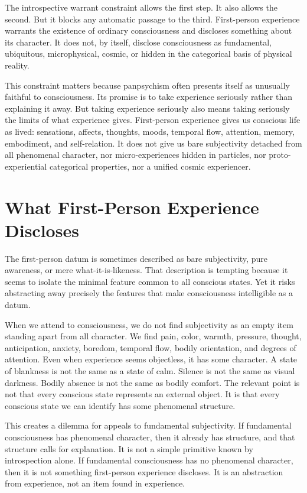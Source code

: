 \documentclass[12pt]{article}
\begin{document}
The introspective warrant constraint allows the first step. It also allows the second. But it blocks any automatic passage to the third. First-person experience warrants the existence of ordinary consciousness and discloses something about its character. It does not, by itself, disclose consciousness as fundamental, ubiquitous, microphysical, cosmic, or hidden in the categorical basis of physical reality.

This constraint matters because panpsychism often presents itself as unusually faithful to consciousness. Its promise is to take experience seriously rather than explaining it away. But taking experience seriously also means taking seriously the limits of what experience gives. First-person experience gives us conscious life as lived: sensations, affects, thoughts, moods, temporal flow, attention, memory, embodiment, and self-relation. It does not give us bare subjectivity detached from all phenomenal character, nor micro-experiences hidden in particles, nor proto-experiential categorical properties, nor a unified cosmic experiencer.

\section{What First-Person Experience Discloses}

The first-person datum is sometimes described as bare subjectivity, pure awareness, or mere what-it-is-likeness. That description is tempting because it seems to isolate the minimal feature common to all conscious states. Yet it risks abstracting away precisely the features that make consciousness intelligible as a datum.

When we attend to consciousness, we do not find subjectivity as an empty item standing apart from all character. We find pain, color, warmth, pressure, thought, anticipation, anxiety, boredom, temporal flow, bodily orientation, and degrees of attention. Even when experience seems objectless, it has some character. A state of blankness is not the same as a state of calm. Silence is not the same as visual darkness. Bodily absence is not the same as bodily comfort. The relevant point is not that every conscious state represents an external object. It is that every conscious state we can identify has some phenomenal structure.

This creates a dilemma for appeals to fundamental subjectivity. If fundamental consciousness has phenomenal character, then it already has structure, and that structure calls for explanation. It is not a simple primitive known by introspection alone. If fundamental consciousness has no phenomenal character, then it is not something first-person experience discloses. It is an abstraction from experience, not an item found in experience.
\end{document}
